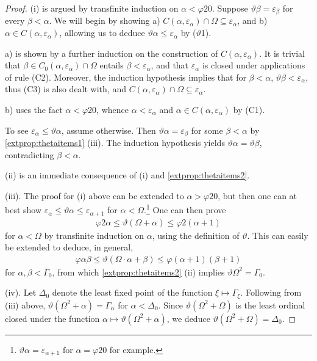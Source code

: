 \documentclass[UKenglish,cleveref,DIV=12]{scrartcl}
\theoremstyle{definition}
\theoremstyle{definition}
\begin{document}
\begin{proof}
 (i) is argued by transfinite induction on $\alpha<\varphi20$. Suppose
$\vartheta\beta=\varepsilon_\beta$ for every $\beta<\alpha$. We will begin by
showing a) $C(\alpha,\varepsilon_\alpha)\cap\Omega\subseteq\varepsilon_\alpha$,
and b) $\alpha\in C(\alpha,\varepsilon_\alpha)$, allowing us to deduce
$\vartheta\alpha\le\varepsilon_\alpha$ by ($\vartheta$1).

a) is shown by a further induction on the construction of $C(\alpha,\varepsilon_\alpha)$. It is trivial that $\beta\in C_0(\alpha,\varepsilon_\alpha)\cap\Omega$ entails $\beta<\varepsilon_\alpha$, and that $\varepsilon_\alpha$ is closed under applications of rule (C2). Moreover, the induction hypothesis implies that for $\beta<\alpha$, $\vartheta\beta<\varepsilon_\alpha$, thus (C3) is also dealt with, and $C(\alpha,\varepsilon_\alpha)\cap\Omega\subseteq\varepsilon_\alpha$.

b) uses the fact $\alpha<\varphi20$, whence $\alpha<\varepsilon_\alpha$ and $\alpha\in C(\alpha,\varepsilon_\alpha)$ by (C1).

To see $\varepsilon_\alpha\le\vartheta\alpha$, assume otherwise. Then $\vartheta\alpha=\varepsilon_\beta$ for some $\beta<\alpha$ by \cref{extprop:thetaitems1} (iii). The induction hypothesis yields $\vartheta\alpha=\vartheta\beta$, contradicting $\beta<\alpha$.

(ii) is an immediate consequence of (i) and \cref{extprop:thetaitems2}.

(iii). The proof for (i) above can be extended to $\alpha>\varphi20$, but then one can at best show $\varepsilon_\alpha\le\vartheta\alpha\le\varepsilon_{\alpha+1}$ for $\alpha<\Omega$.\footnote{$\vartheta\alpha=\varepsilon_{\alpha+1}$ for $\alpha=\varphi20$ for example.} One can then prove
\begin{align*}
  \varphi2\alpha\le\vartheta(\Omega+\alpha)\le\varphi2(\alpha+1)
\end{align*}
for $\alpha<\Omega$ by transfinite induction on $\alpha$, using the definition of
$\vartheta$. This can easily be extended to deduce, in general,
\begin{align*}
 \varphi\alpha\beta\le\vartheta(\Omega\cdot\alpha+\beta)\le\varphi(\alpha+1)(\beta+1)
\end{align*}
for $\alpha,\beta<\Gamma_0$, from which \cref{extprop:thetaitems2} (ii) implies
$\vartheta\Omega^2=\Gamma_0$.

(iv). Let $\Delta_0$ denote the least fixed point of the function
$\xi\mapsto\Gamma_\xi$. Following from (iii) above,
$\vartheta(\Omega^2+\alpha)=\Gamma_\alpha$ for $\alpha<\Delta_0$. Since
$\vartheta(\Omega^2+\Omega)$ is the least ordinal closed under the function
$\alpha\mapsto\vartheta(\Omega^2+\alpha)$, we deduce $\vartheta(\Omega^2+\Omega)
=\Delta_0$.
\end{proof}
\end{document}
